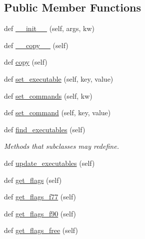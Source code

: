 \subsection*{Public Member Functions}
\begin{DoxyCompactItemize}
\item 
def \hyperlink{classnumpy_1_1distutils_1_1fcompiler_1_1FCompiler_ab30309afa176125222ffdd36b6b5b6e4}{\+\_\+\+\_\+init\+\_\+\+\_\+} (self, args, kw)
\item 
def \hyperlink{classnumpy_1_1distutils_1_1fcompiler_1_1FCompiler_a05e597d2dccf240a4ba9a2284437d6e7}{\+\_\+\+\_\+copy\+\_\+\+\_\+} (self)
\item 
def \hyperlink{classnumpy_1_1distutils_1_1fcompiler_1_1FCompiler_a3de17a2924e4a9fb1b65805dfc8f08fd}{copy} (self)
\item 
def \hyperlink{classnumpy_1_1distutils_1_1fcompiler_1_1FCompiler_a0a5b66e5ac5986ce96a8b01291873023}{set\+\_\+executable} (self, key, value)
\item 
def \hyperlink{classnumpy_1_1distutils_1_1fcompiler_1_1FCompiler_ae264166fb160d1b9fec1dce79a0d7888}{set\+\_\+commands} (self, kw)
\item 
def \hyperlink{classnumpy_1_1distutils_1_1fcompiler_1_1FCompiler_ae00bca1c5e690b9fb42982b7bdc564ea}{set\+\_\+command} (self, key, value)
\item 
def \hyperlink{classnumpy_1_1distutils_1_1fcompiler_1_1FCompiler_a9dc623a5d302a30ae0a9ebad1d7d09df}{find\+\_\+executables} (self)
\begin{DoxyCompactList}\small\item\em Methods that subclasses may redefine. \end{DoxyCompactList}\item 
def \hyperlink{classnumpy_1_1distutils_1_1fcompiler_1_1FCompiler_a5cf45c68f9ee1b6c67d5e3c71b8569a3}{update\+\_\+executables} (self)
\item 
def \hyperlink{classnumpy_1_1distutils_1_1fcompiler_1_1FCompiler_a3ee435b728176c2ddeba601eb266646d}{get\+\_\+flags} (self)
\item 
def \hyperlink{classnumpy_1_1distutils_1_1fcompiler_1_1FCompiler_a5efe0537b5d957a3df7648bd40635fd3}{get\+\_\+flags\+\_\+f77} (self)
\item 
def \hyperlink{classnumpy_1_1distutils_1_1fcompiler_1_1FCompiler_ae625d5e375d5ba3aae9789864199af36}{get\+\_\+flags\+\_\+f90} (self)
\item 
def \hyperlink{classnumpy_1_1distutils_1_1fcompiler_1_1FCompiler_aeae7c2c709fecc23ca5fcaa19fbfbfd9}{get\+\_\+flags\+\_\+free} (self)

\end{DoxyCompactItemize}
